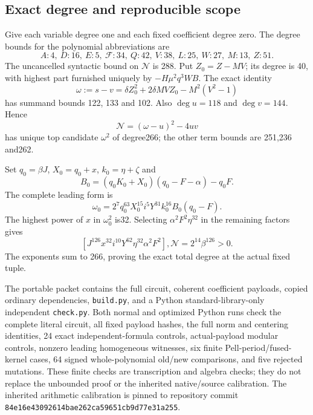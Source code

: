 \subsection{Exact degree and reproducible scope}
Give each variable degree one and each fixed coefficient degree zero.
The degree bounds for the polynomial abbreviations are
\[
 A:4,\ D:16,\ E:5,\ \mathcal F:34,\ Q:42,\ V:38,\ L:25,
 \ W:27,\ M:13,\ Z:51.
\]
The uncancelled syntactic bound on $\mathcal N$ is 288. Put $Z_0=Z-MV$;
its degree is 40, with highest part furnished uniquely by
$-H\mu^2q^3WB$. The exact identity
\[
 \omega:=s-v
  =\delta Z_0^2+2\delta MVZ_0-M^2(V^2-1)
\]
has summand bounds 122, 133 and 102. Also $\deg u=118$ and
$\deg v=144$. Hence
\[
 \mathcal N=(\omega-u)^2-4uv
\]
has unique top candidate $\omega^2$ of degree266; the other term bounds
are 251,236 and262.

Set $q_0=\beta J$, $X_0=q_0+x$, $k_0=\eta+\zeta$ and
\[
 B_0=(q_0K_0+X_0)(q_0-F-\alpha)-q_0F.
\]
The complete leading form is
\[
 \omega_0=2^7q_0^{63}X_0^{15}i^5Y^{31}k_0^{16}B_0(q_0-F).
\]
The highest power of $x$ in $\omega_0^2$ is32. Selecting
$\alpha^2F^2\eta^{32}$ in the remaining factors gives
\[
 [J^{126}x^{32}i^{10}Y^{62}\eta^{32}\alpha^2F^2],\mathcal N
                  =2^{14}\beta^{126}>0.
\]
The exponents sum to 266, proving the exact total degree at the actual
fixed tuple.

The portable packet contains the full circuit, coherent coefficient
payloads, copied ordinary dependencies, \texttt{build.py}, and a Python
standard-library-only independent \texttt{check.py}. Both normal and
optimized Python runs check the complete literal circuit, all fixed
payload hashes, the full norm and centering identities, 24 exact
independent-formula controls, actual-payload modular controls, nonzero
leading homogeneous witnesses, six finite Pell-period/fused-kernel cases,
64 signed whole-polynomial old/new comparisons, and five rejected mutations. These finite checks are transcription and
algebra checks; they do not replace the unbounded proof or the inherited
native/source calibration. The inherited arithmetic calibration is pinned to
repository commit \texttt{84e16e43092614ba}\allowbreak\texttt{e262ca59651cb9d77e31a255}.
